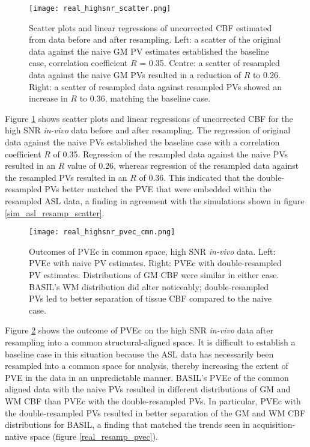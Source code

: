 \begin{figure}[H]
\centering
\texttt{[image: real\_highsnr\_scatter.png]}
\caption{Scatter plots and linear regressions of uncorrected CBF estimated from data before and after resampling. Left: a scatter of the original data against the naive GM PV estimates established the baseline case, correlation coefficient $R$ = 0.35. Centre: a scatter of resampled data against the naive GM PVs resulted in a reduction of $R$ to 0.26. Right: a scatter of resampled data against resampled PVs showed an increase in $R$ to 0.36, matching the baseline case.}
\label{real_highsnr_scatter}
\end{figure}

Figure \ref{real_highsnr_scatter} shows scatter plots and linear regressions of uncorrected CBF for the high SNR \textit{in-vivo} data before and after resampling. The regression of original data against the naive PVs established the baseline case with a correlation coefficient $R$ of 0.35. Regression of the resampled data against the naive PVs resulted in an $R$ value of 0.26, whereas regression of the resampled data against the resampled PVs resulted in an $R$ of 0.36. This indicated that the double-resampled PVs better matched the PVE that were embedded within the resampled ASL data, a finding in agreement with the simulations shown in figure \ref{sim_asl_resamp_scatter}. 

\begin{figure}[H]
\centering
\texttt{[image: real\_highsnr\_pvec\_cmn.png]}
\caption{Outcomes of PVEc in common space, high SNR \textit{in-vivo} data. Left: PVEc with naive PV estimates. Right: PVEc with double-resampled PV estimates. Distributions of GM CBF were similar in either case. BASIL's WM distribution did alter noticeably;  double-resampled PVs led to better separation of tissue CBF compared to the naive case.}
\label{real_highsnr_pvec_cmn}
\end{figure}

Figure \ref{real_highsnr_pvec_cmn} shows the outcome of PVEc on the high SNR \textit{in-vivo} data after resampling into a common structural-aligned space. It is difficult to establish a baseline case in this situation because the ASL data has necessarily been resampled into a common space for analysis, thereby increasing the extent of PVE in the data in an unpredictable manner. BASIL's PVEc of the common aligned data with the naive PVs resulted in different distributions of GM and WM CBF than PVEc with the double-resampled PVs. In particular, PVEc with the double-resampled PVs resulted in better separation of the GM and WM CBF distributions for BASIL, a finding that matched the trends seen in acquisition-native space (figure \ref{real_resamp_pvec}).

